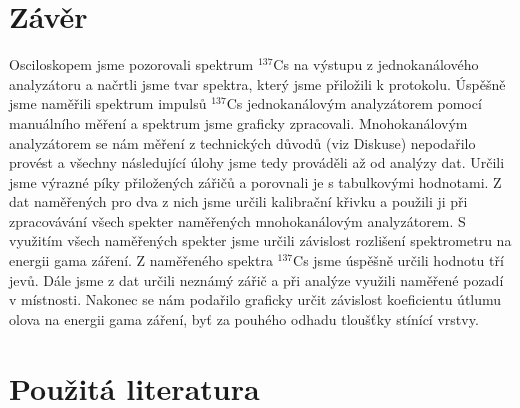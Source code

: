 \documentclass[english]{article}
\begin{document}
\section{Závěr}
		Osciloskopem jsme pozorovali spektrum $^{137}$Cs na výstupu z jednokanálového analyzátoru a načrtli jsme tvar spektra, který jsme přiložili k protokolu. Úspěšně jsme naměřili spektrum impulsů $^{137}$Cs jednokanálovým analyzátorem pomocí manuálního měření a spektrum jsme graficky zpracovali. Mnohokanálovým analyzátorem se nám měření z technických důvodů (viz Diskuse) nepodařilo provést a všechny následující úlohy jsme tedy prováděli až od analýzy dat. Určili jsme výrazné píky přiložených zářičů a porovnali je s tabulkovými hodnotami. Z dat naměřených pro dva z nich jsme určili kalibrační křivku a použili ji při zpracovávání všech spekter naměřených mnohokanálovým analyzátorem. S využitím všech naměřených spekter jsme určili závislost rozlišení spektrometru na energii gama záření. Z naměřeného spektra $^{137}$Cs jsme úspěšně určili hodnotu tří jevů. Dále jsme z dat určili neznámý zářič a při analýze využili naměřené pozadí v místnosti. Nakonec se nám podařilo graficky určit závislost koeficientu útlumu olova na energii gama záření, byť za pouhého odhadu tloušťky stínící vrstvy. 
		
\section {Použitá literatura}
\begingroup
\renewcommand{\section}[2]{}
\end{document}
